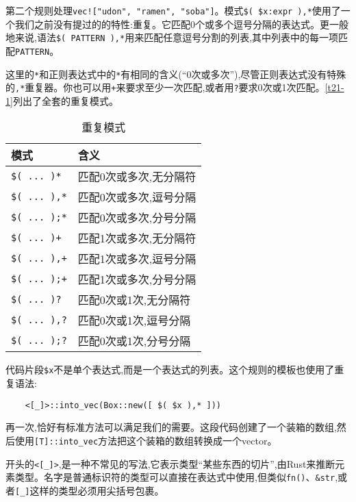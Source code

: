 第二个规则处理\texttt{vec!["udon", "ramen", "soba"]}。模式\texttt{\$( \$x:expr ),*}使用了一个我们之前没有提过的的特性:重复。它匹配0个或多个逗号分隔的表达式。更一般地来说,语法\texttt{\$( PATTERN ),*}用来匹配任意逗号分割的列表,其中列表中的每一项匹配\texttt{PATTERN}。

这里的\texttt{*}和正则表达式中的\texttt{*}有相同的含义(“0次或多次”),尽管正则表达式没有特殊的\texttt{,*}重复器。你也可以用\texttt{+}来要求至少一次匹配,或者用\texttt{?}要求0次或1次匹配。\autoref{t21-1}列出了全套的重复模式。

\begin{table}[htbp]
    \centering
    \caption{重复模式}
    \label{t21-1}
    \begin{tabular}{ll}
        \hline
        \textbf{模式} & \textbf{含义} \\
        \hline
        \texttt{\$( ... )*}     & 匹配0次或多次,无分隔符   \\
        \rowcolor{tablecolor}
        \texttt{\$( ... ),*}    & 匹配0次或多次,逗号分隔   \\
        \texttt{\$( ... );*}    & 匹配0次或多次,分号分隔   \\
        \rowcolor{tablecolor}
        \texttt{\$( ... )+}     & 匹配1次或多次,无分隔符   \\
        \texttt{\$( ... ),+}    & 匹配1次或多次,逗号分隔   \\
        \rowcolor{tablecolor}
        \texttt{\$( ... );+}    & 匹配1次或多次,分号分隔   \\
        \texttt{\$( ... )?}     & 匹配0次或1次,无分隔符    \\
        \rowcolor{tablecolor}
        \texttt{\$( ... ),?}    & 匹配0次或1次,逗号分隔    \\
        \texttt{\$( ... );?}    & 匹配0次或1次,分号分隔    \\
    \end{tabular}
\end{table}

代码片段\texttt{\$x}不是单个表达式,而是一个表达式的列表。这个规则的模板也使用了重复语法:
\begin{verbatim}
    <[_]>::into_vec(Box::new([ $( $x ),* ]))
\end{verbatim}

再一次,恰好有标准方法可以满足我们的需要。这段代码创建了一个装箱的数组,然后使用\texttt{[T]::into\_vec}方法把这个装箱的数组转换成一个vector。

开头的\texttt{<[\_]>},是一种不常见的写法,它表示类型“某些东西的切片”,由Rust来推断元素类型。名字是普通标识符的类型可以直接在表达式中使用,但类似\texttt{fn()}、\texttt{\&str},或者\texttt{[\_]}这样的类型必须用尖括号包裹。

